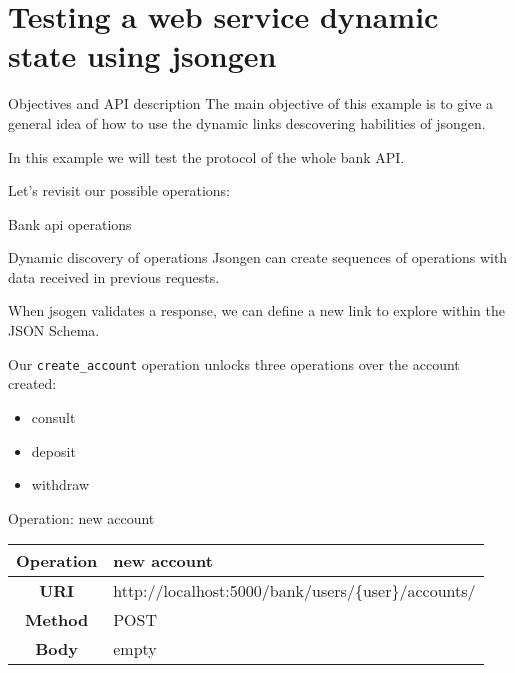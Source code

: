 \section{Testing a web service dynamic state using jsongen}

\begin{frame}{Objectives and API description}%
  The main objective of this example is to give a general idea of how
  to use the dynamic links descovering habilities of jsongen.

  In this example we will test the protocol of the whole bank API.%

  Let's revisit our possible operations:%
\end{frame}

\begin{frame}{Bank api operations}
  \begin{figure}
    \centering
  \end{figure}
\end{frame}

\begin{frame}{Dynamic discovery of operations}%
  Jsongen can create sequences of operations with data received in
  previous requests.

  When jsogen validates a response, we can define a new link to
  explore within the JSON Schema.

  Our \texttt{create\_account} operation unlocks three operations over
  the account created:%
  \begin{itemize}
  \item consult
  \item deposit
  \item withdraw
  \end{itemize}
\end{frame}

\begin{frame}{Operation: new account}
  \centering
  \begin{tabular}{| c | l |}
    \hline
    \textbf{Operation} & new account \\ \hline
    \textbf{URI}       & http://localhost:5000/bank/users/\{user\}/accounts/ \\ \hline
    \textbf{Method}    & POST     \\ \hline
    \textbf{Body}      & empty    \\ \hline
  \end{tabular}
  \centering
  \inputminted{js}{./code/example2_new_account.jsch}
\end{frame}

